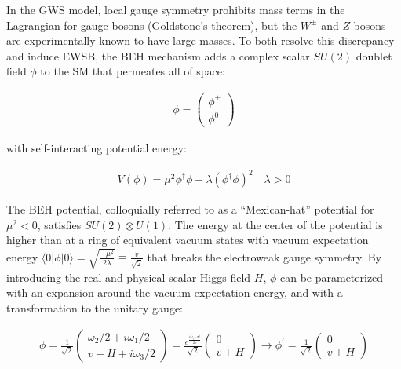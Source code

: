 \begin{refsection}
In the GWS model, local gauge symmetry prohibits mass terms in the Lagrangian for gauge bosons (Goldstone's theorem), but the $W^\pm$ and $Z$ bosons are experimentally known to have large masses.
To both resolve this discrepancy and induce EWSB, the BEH mechanism adds a complex scalar $SU(2)$ doublet field $\phi$ to the SM that permeates all of space:
\begin{linenomath*}
\begin{align}
\phi=\left(\begin{array}{l}
\phi^{+} \\
\phi^0
\end{array}\right)
\end{align}
\end{linenomath*}
with self-interacting potential energy:
\begin{linenomath*}
\begin{align}
V(\phi) = \mu^2 \phi^{\dagger} \phi + \lambda\left(\phi^{\dagger} \phi\right)^2 \quad \lambda >0
\end{align}
\end{linenomath*}
The BEH potential, colloquially referred to as a ``Mexican-hat'' potential for $\mu^2 < 0$, satisfies $SU(2) \otimes U(1)$.
The energy at the center of the potential is higher than at a ring of equivalent vacuum states with vacuum expectation energy $\langle 0 \vert \phi \vert 0 \rangle=\sqrt{\frac{-\mu^2}{2 \lambda}} \equiv \frac{v}{\sqrt{2}}$ that breaks the electroweak gauge symmetry.
By introducing the real and physical scalar Higgs field $H$, $\phi$ can be parameterized with an expansion around the vacuum expectation energy, and with a transformation to the unitary gauge:
\begin{linenomath*}
\begin{align}
\phi
=\frac{1}{\sqrt{2}}
\left(\begin{array}{l}
\omega_2/2 + i \omega_1/2 \\
v + H + i \omega_3/2
\end{array}\right)
= \frac{e^{\frac{ i \omega_j \cdot \sigma^j}{2v}}}{\sqrt{2}}
\left(\begin{array}{c}
0 \\
v+H
\end{array}\right)
\longrightarrow \phi^{\prime} = \frac{1}{\sqrt{2}}
\left(\begin{array}{c}
0 \\
v+H
\end{array}\right)
\end{align}
\end{linenomath*}

\end{refsection}
